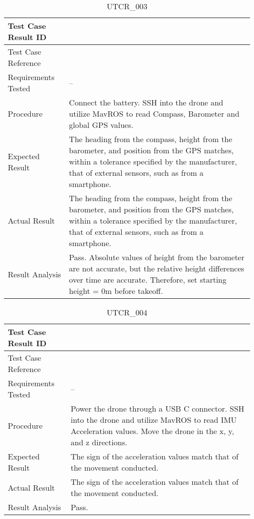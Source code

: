 \documentclass[12pt, titlepage]{article}
\begin{document}
\begin{table}[!h]
\begin{center}
\caption {UTCR\_003}
\label{tab:UTCR_003}
\begin{tabular}{ | m{3.2cm} | m{12.2cm} | } 
\hline
Test Case Result ID & \nameref{tab:UTCR_003} \\ 
\hline
Test Case Reference & \nameref{tab:UTC_003}  \\ 
\hline
Requirements Tested & -- \\ 
\hline
Procedure & Connect the battery. SSH into the drone and utilize MavROS to read Compass, Barometer and global GPS values.  \\ 
\hline
Expected Result & The heading from the compass, height from the barometer, and position from the GPS matches, within a tolerance specified by the manufacturer, that of external sensors, such as from a smartphone. \\ 
\hline
Actual Result & The heading from the compass, height from the barometer, and position from the GPS matches, within a tolerance specified by the manufacturer, that of external sensors, such as from a smartphone. \\ 
\hline
Result Analysis & Pass. Absolute values of height from the barometer are not accurate, but the relative height differences over time are accurate. Therefore, set starting height = 0m before takeoff. \\ 
\hline
\end{tabular}
\end{center}
\end{table}

\begin{table}[!h]
\begin{center}
\caption {UTCR\_004}
\label{tab:UTCR_004}
\begin{tabular}{ | m{3.2cm} | m{12.2cm} | } 
\hline
Test Case Result ID & \nameref{tab:UTCR_004} \\ 
\hline
Test Case Reference & \nameref{tab:UTC_004}  \\ 
\hline
Requirements Tested & -- \\ 
\hline
Procedure & Power the drone through a USB C connector. SSH into the drone and utilize MavROS to read IMU Acceleration values. Move the drone in the x, y, and z directions. \\ 
\hline
Expected Result & The sign of the acceleration values match that of the movement conducted. \\ 
\hline
Actual Result & The sign of the acceleration values match that of the movement conducted. \\ 
\hline
Result Analysis & Pass. \\ 
\hline
\end{tabular}
\end{center}
\end{table}
\end{document}

